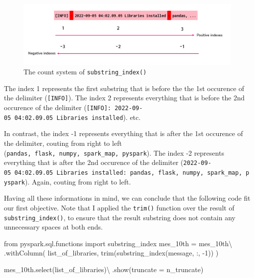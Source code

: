 \documentclass[
  11pt,
  letterpaper,
  DIV=11,
  numbers=noendperiod]{scrreprt}
\newenvironment{Shaded}{\begin{snugshade}}{\end{snugshade}}
\newcommand{\DecValTok}[1]{\textcolor[rgb]{0.68,0.00,0.00}{#1}}
\newcommand{\ImportTok}[1]{\textcolor[rgb]{0.00,0.46,0.62}{#1}}
\newcommand{\NormalTok}[1]{\textcolor[rgb]{0.00,0.23,0.31}{#1}}
\newcommand{\OperatorTok}[1]{\textcolor[rgb]{0.37,0.37,0.37}{#1}}
\newcommand{\StringTok}[1]{\textcolor[rgb]{0.13,0.47,0.30}{#1}}
\begin{document}
\begin{figure}

{\centering \includegraphics{Chapters/./../Figures/substring-delimiter2.png}

}

\caption{\label{fig-substring-delimiter2}The count system of
\texttt{substring\_index()}}

\end{figure}

The index 1 represents the first substring that is before the the 1st
occurence of the delimiter (\texttt{{[}INFO{]}}). The index 2 represents
everything that is before the 2nd occurence of the delimiter
(\texttt{{[}INFO{]}:\ 2022-09-05\ 04:02.09.05\ Libraries\ installed}).
etc.

In contrast, the index -1 represents everything that is after the 1st
occurence of the delimiter, couting from right to left
(\texttt{pandas,\ flask,\ numpy,\ spark\_map,\ pyspark}). The index -2
represents everything that is after the 2nd occurence of the delimiter
(\texttt{2022-09-05\ 04:02.09.05\ Libraries\ installed:\ pandas,\ flask,\ numpy,\ spark\_map,\ pyspark}).
Again, couting from right to left.

Having all these informations in mind, we can conclude that the
following code fit our first objective. Note that I applied the
\texttt{trim()} function over the result of \texttt{substring\_index()},
to ensure that the result substring does not contain any unnecessary
spaces at both ends.

\begin{Shaded}
\begin{Highlighting}[]
\ImportTok{from}\NormalTok{ pyspark.sql.functions }\ImportTok{import}\NormalTok{ substring\_index}
\NormalTok{mes\_10th }\OperatorTok{=}\NormalTok{ mes\_10th}\OperatorTok{\textbackslash{}}
\NormalTok{    .withColumn(}
        \StringTok{\textquotesingle{}list\_of\_libraries\textquotesingle{}}\NormalTok{,}
\NormalTok{        trim(substring\_index(}\StringTok{\textquotesingle{}message\textquotesingle{}}\NormalTok{, }\StringTok{\textquotesingle{}:\textquotesingle{}}\NormalTok{, }\OperatorTok{{-}}\DecValTok{1}\NormalTok{))}
\NormalTok{    )}

\NormalTok{mes\_10th.select(}\StringTok{\textquotesingle{}list\_of\_libraries\textquotesingle{}}\NormalTok{)}\OperatorTok{\textbackslash{}}
\NormalTok{    .show(truncate }\OperatorTok{=}\NormalTok{ n\_truncate)}
\end{Highlighting}
\end{Shaded}
\end{document}
